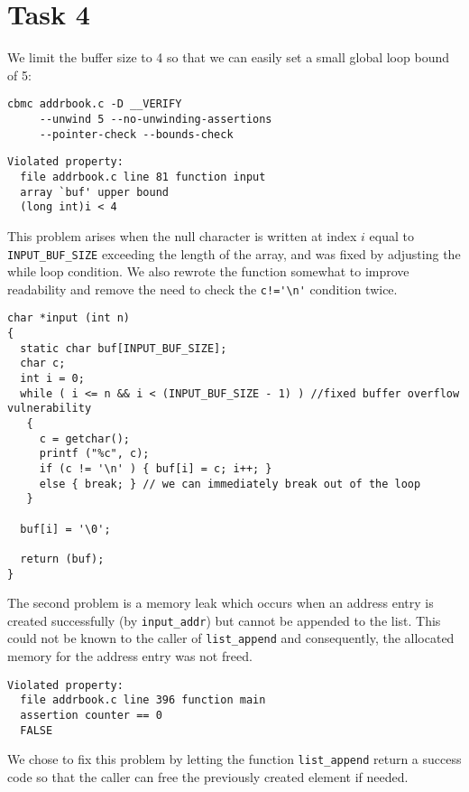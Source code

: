 \section*{Task 4}
We limit the buffer size to 4 so that we can easily set a small global loop bound of 5:
\begin{Verbatim}[formatcom=\color{red}]
cbmc addrbook.c -D __VERIFY 
     --unwind 5 --no-unwinding-assertions
     --pointer-check --bounds-check 
\end{Verbatim}

\begin{Verbatim}[fontsize=\footnotesize]
Violated property:
  file addrbook.c line 81 function input
  array `buf' upper bound
  (long int)i < 4
\end{Verbatim}
This problem arises when the null character is written at index $i$ equal to \verb|INPUT_BUF_SIZE| exceeding the length of the array, and was fixed by adjusting the while loop condition. We also rewrote the function somewhat to improve readability and remove the need to check the \verb|c!='\n'| condition twice. 

\begin{lstlisting}
char *input (int n)
{
  static char buf[INPUT_BUF_SIZE];
  char c;
  int i = 0;
  while ( i <= n && i < (INPUT_BUF_SIZE - 1) ) //fixed buffer overflow vulnerability
   { 
     c = getchar();
     printf ("%c", c);
     if (c != '\n' ) { buf[i] = c; i++; } 
     else { break; } // we can immediately break out of the loop
   }

  buf[i] = '\0';

  return (buf);
}
\end{lstlisting}

The second problem is a memory leak which occurs when an address entry is created successfully (by \texttt{input\_addr})  but cannot be appended to the list. This could not be known to the caller of \texttt{list\_append} and consequently, the allocated memory for the address entry was not freed.
\begin{Verbatim}[fontsize=\footnotesize]
Violated property:
  file addrbook.c line 396 function main
  assertion counter == 0
  FALSE
\end{Verbatim}
We chose to fix this problem by letting the function \texttt{list\_append} return a success code so that the caller can free the previously created element if needed.

